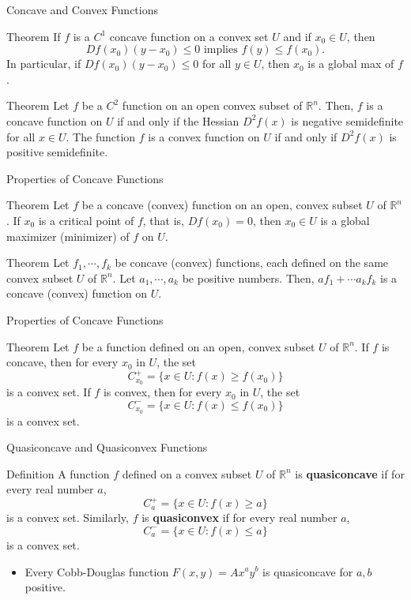 \documentclass{beamer}
\begin{document}
\begin{frame}{Concave and Convex Functions}

\begin{block}{Theorem}
If $f$ is a $C^1$ concave function on a convex set $U$ and if $x_0\in U$, then 
\[Df(x_0)(y-x_0)\leq 0 \text{ implies }f(y)\leq f(x_0).
\]
In particular, if $Df(x_0)(y-x_0)\leq 0$ for all $y\in U$, then $x_0$ is a global max of $f$.
\end{block}
\begin{block}{Theorem}
Let $f$ be a $C^2$ function on an open convex subset of $\mathbb{R}^n$. Then, $f$ is a concave function on $U$ if and only if the Hessian $D^2f(x)$ is negative semidefinite for all $x\in U$. The function $f$ is a convex function on $U$ if and only if $D^2f(x)$ is positive semidefinite. 
\end{block}
\end{frame}
\begin{frame}{Properties of Concave Functions}
    \begin{block}{Theorem}
    Let $f$ be a concave (convex) function on an open, convex subset $U$ of $\mathbb{R}^n$. If $x_0$ is a critical point of $f$, that is, $Df(x_0)=0$, then $x_0\in U$ is a global maximizer (minimizer) of $f$ on $U$.
    \end{block}
    \begin{block}{Theorem}
    Let $f_1,\cdots, f_k$ be concave (convex) functions, each defined on the same convex subset $U$ of $\mathbb{R}^n$. Let $a_1,\cdots, a_k$ be positive numbers. Then, $af_1+\cdots a_kf_k$ is a concave (convex) function on $U$.
    \end{block}
    \end{frame}
\begin{frame}{Properties of Concave Functions}

\begin{block}{Theorem}
Let $f$ be a  function defined on an open, convex subset $U$ of $\mathbb{R}^n$. If $f$ is concave, then for every $x_0$ in $U$, the set
\[C_{x_0}^+=\{x\in U:f(x)\geq f(x_0)\}
\]
is a convex set. If $f$ is convex, then for every $x_0$ in $U$, the set
\[C_{x_0}^-=\{x\in U:f(x)\leq f(x_0)\}
\] is a convex set. 
\end{block}
\end{frame}

\begin{frame}{Quasiconcave and Quasiconvex Functions}
    \begin{block}{Definition}
    A function $f$ defined on a convex subset  $U$ of $\mathbb{R}^n$ is \textbf{quasiconcave} if for every real number $a$, 
    \[C_{a}^+=\{x\in U:f(x)\geq a\}
\]
is a convex set. Similarly, $f$ is \textbf{quasiconvex} if for every real number $a$, \[C_{a}^-=\{x\in U:f(x)\leq a\}
\] is a convex set. 
    \end{block}
    \begin{itemize}
        \item Every Cobb-Douglas function $F(x, y)=Ax^ay^b$ is quasiconcave for $a, b$ positive. 
    \end{itemize}
    \end{frame}
\end{document}
